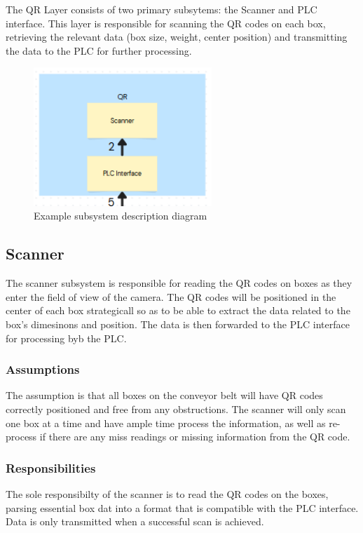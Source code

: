 The QR Layer consists of two primary subsytems: the Scanner and PLC interface. This layer is responsible for scanning the QR codes on each box, retrieving the relevant data (box size, weight, center position) and transmitting the data to the PLC for further processing.

\begin{figure}[h!]
	\centering
 	\includegraphics[width=0.60\textwidth]{images/Qr}
 \caption{Example subsystem description diagram}
\end{figure}


\subsection{Scanner}
The scanner subsystem is responsible for reading the QR codes on boxes as they enter the field of view of the camera. The QR codes will be positioned in the center of each box strategicall so as to be able to extract the data related to the box's dimesinons and position. The data is then forwarded to the PLC interface for processing byb the PLC.
\subsubsection{Assumptions}
The assumption is that all boxes on the conveyor belt will have QR codes correctly positioned and free from any obstructions. The scanner will only scan one box at a time and have ample time process the information, as well as re-process if there are any miss readings or missing information from the QR code.

\subsubsection{Responsibilities}
The sole responsibilty of the scanner is to read the QR codes on the boxes, parsing essential box dat into a format that is compatible with the PLC interface. Data is only transmitted when a successful scan is achieved.

